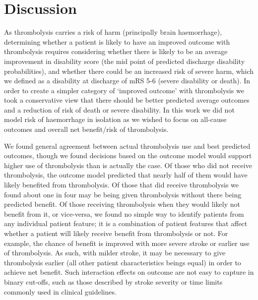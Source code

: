 \section{Discussion}




As thrombolysis carries a risk of harm (principally brain haemorrhage), determining whether a patient is likely to have an improved outcome with thrombolysis requires considering whether there is likely to be an average improvement in disability score (the mid point of predicted discharge disability probabilities), and whether there could be an increased risk of severe harm, which we defined as a disability at discharge of mRS 5-6 (severe disability or death). In order to create a simpler category of `improved outcome' with thrombolysis we took a conservative view that there should be better predicted average outcomes and a reduction of risk of death or severe disability. In this work we did not model risk of haemorrhage in isolation as we wished to focus on all-cause outcomes and overall net benefit/risk of thrombolysis.

We found general agreement between actual thrombolysis use and best predicted outcomes, though we found decisions based on the outcome model would support higher use of thrombolysis than is actually the case. Of those who did not receive thrombolysis, the outcome model predicted that nearly half of them would have likely benefited from thrombolysis. Of those that did receive thrombolysis we found about one in four may be being given thrombolysis without there being predicted benefit. Of those receiving thrombolysis when they would likely not benefit from it, or vice-versa, we found no simple way to identify patients from any individual patient feature; it is a combination of patient features that affect whether a patient will likely receive benefit from thrombolysis or not. For example, the chance of benefit is improved with more severe stroke or earlier use of thrombolysis. As such, with milder stroke, it may be necessary to give thrombolysis earlier (all other patient characteristics beings equal) in order to achieve net benefit. Such interaction effects on outcome are not easy to capture in binary cut-offs, such as those described by stroke severity or time limits commonly used in clinical guidelines.

